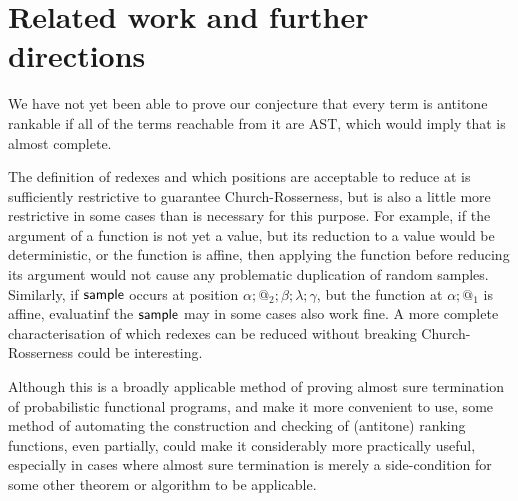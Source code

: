 \section{Related work and further directions}


\label{sec:related}
We have not yet been able to prove our conjecture that every term is antitone rankable if all of the terms reachable from it are AST, which would imply that  is almost complete.

The definition \label{def:more general red} of redexes and which positions are acceptable to reduce at is sufficiently restrictive to guarantee Church-Rosserness, but is also a little more restrictive in some cases than is necessary for this purpose. For example, if the argument of a function is not yet a value, but its reduction to a value would be deterministic, or the function is affine, then applying the function before reducing its argument would not cause any problematic duplication of random samples. Similarly, if $\mathsf{sample}$ occurs at position $\alpha;@_2;\beta;\lambda;\gamma$, but the function at $\alpha;@_1$ is affine, evaluatinf the $\mathsf{sample}$ may in some cases also work fine. A more complete characterisation of which redexes can be reduced without breaking Church-Rosserness could be interesting.

Although this is a broadly applicable method of proving almost sure termination of probabilistic functional programs, and  make it more convenient to use, some method of automating the construction and checking of (antitone) ranking functions, even partially, could make it considerably more practically useful, especially in cases where almost sure termination is merely a side-condition for some other theorem or algorithm to be applicable.
